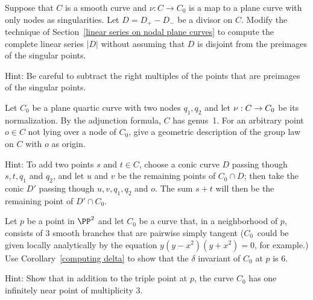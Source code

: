 \begin{exercise}\label{general case of divisors on nodal curves}
Suppose that $C$ is a smooth curve and $\nu: C \to C_0$ is a map to a
plane curve with
only nodes as singularities. Let $D = D_{+}-D_{-}$ be a divisor on
$C$. Modify the
technique of Section~\ref{linear series on nodal plane curves} to compute
the 
complete linear series 
$|D|$ without assuming that $D$ is disjoint from the
%
preimages of the singular
%
points.

Hint: Be careful to subtract the right multiples of the points that are
preimages of the singular
points.
\end{exercise}

\begin{exercise}
Let $C_0$ be a 
plane quartic curve 
%
%
with two nodes $q_1, q_2$
and
let $\nu :\nobreak C \to C_0$ be its normalization.
%
By the adjunction formula, $C$ has genus~1.
For an arbitrary point
$o \in C$ not
lying over a node of $C_0$,
 give a geometric description
of the 
group law
%
on $C$ with $o$ as origin.

Hint: To add two points $s$ and $t \in C$, choose a conic curve $D$
passing though $s, t, q_1$ and $q_2$, and let $u$ and $v$ be the remaining
points of $C_0 \cap D$; then take the conic
$D'$ passing though $u, v,
q_1, q_2$ and $o$. The sum $s+t$ will then be the remaining point of $D'
\cap C_0$.
\end{exercise}

\begin{exercise}
Let $p$ be a point in $\PP^{2}$ and let $C_{0}$ be a curve that, in
a neighborhood of $p$, consists of 3 smooth branches that are
pairwise simply tangent ($C_{0}$~could be given locally analytically
by the equation $y(y-x^{2})(y+x^{2})=0$, for example.) Use
Corollary~\ref{computing delta} to show that the $\delta$ invariant
of $C_{0}$ at $p$ is 6.

Hint: Show that in addition to the triple point at $p$, the curve $C_{0}$ has one infinitely near point of multiplicity 3.
\end{exercise}

